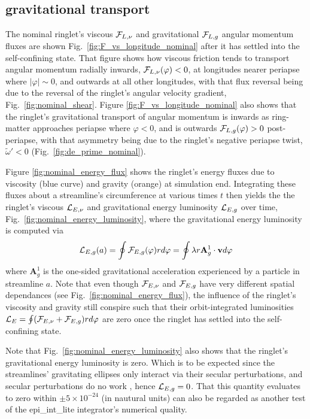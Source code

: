 \documentclass[preprint]{aastex62}
\begin{document}
\subsection{gravitational transport}
\label{subsec:gravitational_flux}

The nominal ringlet's viscous ${\cal F}_{L,\nu}$ and gravitational ${\cal F}_{L,g}$
angular momentum fluxes are shown Fig.\ \ref{fig:F_vs_longitude_nominal} after it has settled into the self-confining state. 
That figure shows how viscous friction tends to transport angular momentum radially inwards, ${\cal F}_{L,\nu}(\varphi)<0$, 
at longitudes nearer periapse where $|\varphi|\sim0$, and outwards
at all other longitudes, with that flux reversal being due to the
reversal of the ringlet's angular velocity gradient, Fig.\ \ref{fig:nominal_shear}. 
Figure \ref{fig:F_vs_longitude_nominal} also shows that the ringlet's gravitational
transport of angular momentum is inwards as
ring-matter approaches periapse where $\varphi<0$, 
and is outwards ${\cal F}_{L,g}(\varphi)>0$ post-periapse, with that asymmetry being due to the ringlet's
negative periapse twist, $\tilde{\omega}'<0$ (Fig.\ \ref{fig:de_prime_nominal}).

Figure \ref{fig:nominal_energy_flux} shows the ringlet's energy fluxes 
due to viscosity (blue curve) and gravity (orange) at simulation end.
Integrating these fluxes about a streamline's circumference at various times $t$ then yields the
the ringlet's viscous ${\cal L}_{E,\nu}$ and gravitational energy luminosity ${\cal L}_{E,g}$ over time,
Fig.\ \ref{fig:nominal_energy_luminosity}, where the gravitational energy luminosity is computed via
\begin{equation}
    \label{eqn:L_g}
    {\cal L}_{E,g}(a) = \oint {\cal F}_{E,g}(\varphi)rd\varphi = \oint \lambda r\mathbf{A}^1_g\cdot\mathbf{v}d\varphi
\end{equation}
where $\mathbf{A}^1_g$ is the one-sided gravitational acceleration experienced by a particle in streamline $a$.
Note that even though ${\cal F}_{E,\nu}$ and ${\cal F}_{E,g}$ have very different spatial dependances 
(see Fig.\ \ref{fig:nominal_energy_flux}),
the influence of the ringlet's viscosity and gravity still conspire such that their
orbit-integrated luminosities ${\cal L}_{E}=\oint ({\cal F}_{E,\nu}+{\cal F}_{E,g})rd\varphi$ are zero 
once the ringlet has settled into the self-confining state.

Note that Fig.\ \ref{fig:nominal_energy_luminosity} also shows that 
the ringlet's gravitational energy luminosity is zero. Which is to be expected since 
the streamlines' gravitating ellipses only interact via their secular
perturbations, and secular perturbations do no work \citep{BC61}, hence ${\cal L}_{E,g}=0$.
That this quantity evaluates to zero within $\pm5\times10^{-24}$ (in nautural units) can also be regarded
as another test of the epi\_int\_lite integrator's numerical quality.
\end{document}
